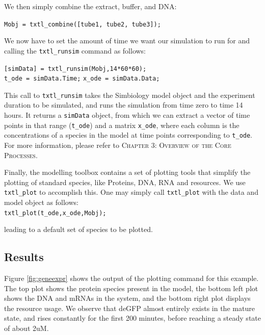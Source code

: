 \documentclass[english]{report}
\begin{document}
We then simply combine the extract, buffer, and DNA:

				\begin{flushleft}
						\texttt{Mobj = txtl\_combine([tube1, tube2, tube3]);} \\	
				\end{flushleft}
							
We now have to set the amount of time we want our simulation to run for and calling the \texttt{txtl\_runsim} command as follows:	

				\begin{flushleft}
						\texttt{[simData] = txtl\_runsim(Mobj,14*60*60);} \\
						\texttt{t\_ode = simData.Time;}
						\texttt{x\_ode = simData.Data;}
				\end{flushleft}	
This call to \texttt{txtl\_runsim} takes the Simbiology model object and the experiment duration to be simulated, and runs the simulation from time zero to time 14 hours. It returns a \texttt{simData} object, from which we can extract a vector of time points in that range (\texttt{t\_ode}) and a matrix \texttt{x\_ode}, where each column is the concentrations of a species in the model at time points corresponding to \texttt{t\_ode}. For more information, please refer to \textsc{Chapter 3: Overview of the Core Processes}. 

Finally, the modelling toolbox contains a set of plotting tools that simplify the plotting of standard species, like Proteins, DNA, RNA and resources. We use \texttt{txtl\_plot} to accomplish this. One may simply call \texttt{txtl\_plot} with the data and model object as follows: \\

\noindent \texttt{txtl\_plot(t\_ode,x\_ode,Mobj); \\}

\noindent leading to a default set of species to be plotted. 
						
		\subsection{Results}
		
		Figure \ref{fig:geneexpr} shows the output of the plotting command for this example. The top plot shows the protein species present in the model, the bottom left plot shows the DNA and mRNAs in the system, and the bottom right plot displays the resource usage. We observe that deGFP almost entirely exists in the mature state, and rises constantly for the first 200 minutes, before reaching a steady state of about 2uM.\\
		
\end{document}
